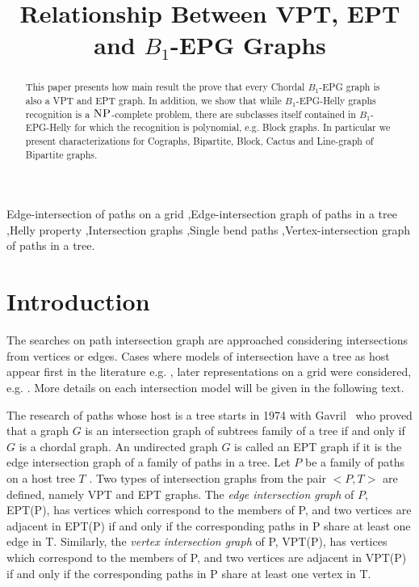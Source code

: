 \documentclass[9pt]{entcs}
\begin{document}
\begin{frontmatter}
  \title{Relationship Between VPT, EPT and $B_1$-EPG Graphs}
  


\begin{abstract}
This paper presents how main result the prove that every Chordal $B_1$-EPG graph is also a VPT and EPT graph. In addition, we show that while $B_1$-EPG-Helly graphs recognition is a $\textsc{NP}$-complete problem, there are subclasses itself contained in $B_1$-EPG-Helly for which the recognition is polynomial, e.g. Block graphs. In particular we present characterizations for Cographs, Bipartite, Block, Cactus and Line-graph of Bipartite  graphs. %
\end{abstract}

\begin{keyword}
Edge-intersection of paths on a grid \sep Edge-intersection graph of paths in a tree  \sep Helly property \sep Intersection graphs \sep Single bend paths \sep Vertex-intersection graph of paths in a tree.
\end{keyword}

\end{frontmatter}


\section{Introduction}

The searches on path intersection graph are approached considering intersections from vertices or edges. Cases where models of intersection have a tree as host appear first in the literature e.g. \cite{gavril1974intersection, golumbic1985edge, golumbic1985}, later representations on a grid were considered, e.g. \cite{golumbic2009,golumbic2013, golumbic2013intersection}. More details on each intersection model will be given in the following text.

The research of paths whose host is a tree starts in 1974 with Gavril~\cite{gavril1974intersection} who proved that a graph $G$ is an intersection graph of subtrees family of a tree if and only if $G$ is a chordal graph. An undirected graph $G$ is called an EPT graph if it is the edge intersection graph of a family of paths in a tree. Let $P$ be a family of paths on a host tree $T$ . Two types of intersection graphs from the pair $<P,T>$ are defined, namely VPT and EPT graphs.
The \textit{edge intersection graph} of $P$, EPT(P), has vertices which correspond to the members of P, and two vertices are adjacent in EPT(P) if and only if the corresponding paths in P share at least one edge in T. Similarly, the \textit{vertex intersection graph} of P, VPT(P), has vertices which correspond to the members of P, and two vertices are adjacent in VPT(P) if and only if the corresponding paths in P share at least one vertex in T.
\end{document}
